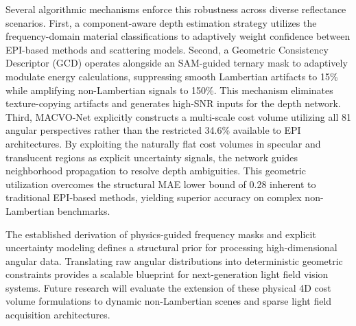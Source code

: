 \documentclass[lettersize,journal]{IEEEtran}
\begin{document}
Several algorithmic mechanisms enforce this robustness across diverse reflectance scenarios. First, a component-aware depth estimation strategy utilizes the frequency-domain material classifications to adaptively weight confidence between EPI-based methods and scattering models. Second, a Geometric Consistency Descriptor (GCD) operates alongside an SAM-guided ternary mask to adaptively modulate energy calculations, suppressing smooth Lambertian artifacts to 15\% while amplifying non-Lambertian signals to 150\%. This mechanism eliminates texture-copying artifacts and generates high-SNR inputs for the depth network. Third, MACVO-Net explicitly constructs a multi-scale cost volume utilizing all 81 angular perspectives rather than the restricted 34.6\% available to EPI architectures. By exploiting the naturally flat cost volumes in specular and translucent regions as explicit uncertainty signals, the network guides neighborhood propagation to resolve depth ambiguities. This geometric utilization overcomes the structural MAE lower bound of 0.28 inherent to traditional EPI-based methods, yielding superior accuracy on complex non-Lambertian benchmarks.

The established derivation of physics-guided frequency masks and explicit uncertainty modeling defines a structural prior for processing high-dimensional angular data. Translating raw angular distributions into deterministic geometric constraints provides a scalable blueprint for next-generation light field vision systems. Future research will evaluate the extension of these physical 4D cost volume formulations to dynamic non-Lambertian scenes and sparse light field acquisition architectures.



\end{document}
